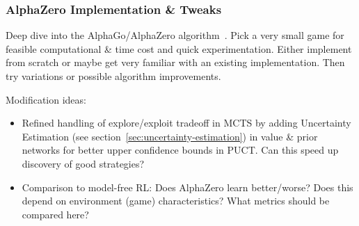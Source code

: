 \documentclass[a4paper]{article}
\begin{document}
\subsubsection{AlphaZero Implementation \& Tweaks}
Deep dive into the AlphaGo/AlphaZero algorithm~\cite{Silver2016, Silver2017, Silver2017a}. Pick a very small game for feasible computational \& time cost and quick experimentation. Either implement from scratch or maybe get very familiar with an existing implementation. Then try variations or possible algorithm improvements.

Modification ideas:
\begin{itemize}
  \item Refined handling of explore/exploit tradeoff in MCTS by adding Uncertainty Estimation (see section~\ref{sec:uncertainty-estimation}) in value \& prior networks for better upper confidence bounds in PUCT. Can this speed up discovery of good strategies?
  \item Comparison to model-free RL: Does AlphaZero learn better/worse? Does this depend on environment (game) characteristics? What metrics should be compared here?
\end{itemize}



\end{document}

